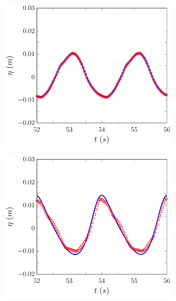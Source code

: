 \begin{figure}
	\centering
	\begin{subfigure}{0.5\textwidth}
		\includegraphics[width=\textwidth]{./chp6/figures/Experiment/Beji/sl/FEVMWG1.pdf}
		\vspace{0.5cm}
	\end{subfigure}%
	\begin{subfigure}{0.5\textwidth}
		\includegraphics[width=\textwidth]{./chp6/figures/Experiment/Beji/sl/FEVMWG2.pdf}

\end{subfigure}
\end{figure}
